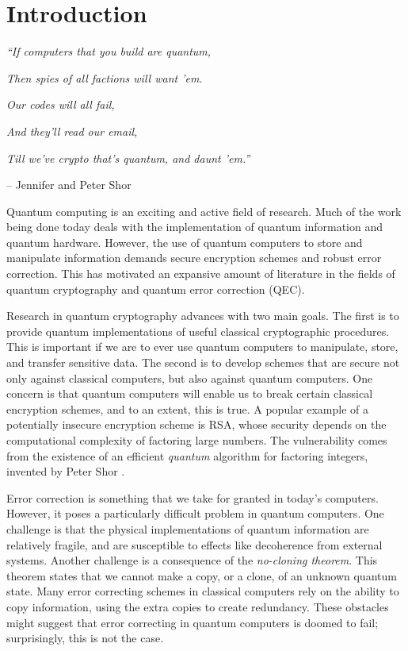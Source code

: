 \chapter{Introduction}
\label{introduction}


\textit{``If computers that you build are quantum,}

\textit{Then spies of all factions will want 'em.}

\textit{Our codes will all fail,}

\textit{And they'll read our email,}

\textit{Till we've crypto that's quantum, and daunt 'em.''}

\quad -- Jennifer and Peter Shor

Quantum computing is an exciting and active field of research. Much of the work being done today deals with the implementation of quantum information and quantum hardware. However, the use of quantum computers to store and manipulate information demands secure encryption schemes and robust error correction. This has motivated an expansive amount of literature in the fields of quantum cryptography and quantum error correction (QEC). 

Research in quantum cryptography advances with two main goals. The first is to provide quantum implementations of useful classical cryptographic procedures. This is important if we are to ever use quantum computers to manipulate, store, and transfer sensitive data. The second is to develop schemes that are secure not only against classical computers, but also against quantum computers. One concern is that quantum computers will enable us to break certain classical encryption schemes, and to an extent, this is true. A popular example of a potentially insecure encryption scheme is RSA, whose security depends on the computational complexity of factoring large numbers. The vulnerability comes from the existence of an efficient \textit{quantum} algorithm for factoring integers, invented by Peter Shor \cite{Shor_1997}. 

Error correction is something that we take for granted in today's computers. However, it poses a particularly difficult problem in quantum computers. One challenge is that the physical implementations of quantum information are relatively fragile, and are susceptible to effects like decoherence from external systems. Another challenge is a consequence of the \textit{no-cloning theorem}. This theorem states that we cannot make a copy, or a clone, of an unknown quantum state. Many error correcting schemes in classical computers rely on the ability to copy information, using the extra copies to create redundancy. These obstacles might suggest that error correcting in quantum computers is doomed to fail; surprisingly, this is not the case.

